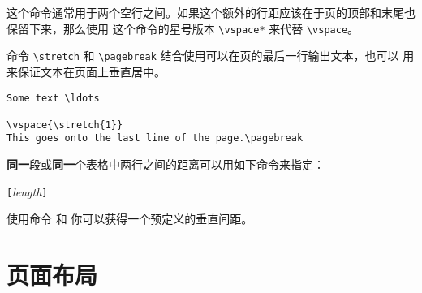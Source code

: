 这个命令通常用于两个空行之间。如果这个额外的行距应该在于页的顶部和末尾也保留下来，那么使用
这个命令的星号版本 \verb|\vspace*| 来代替 \verb|\vspace|。

命令 \verb|\stretch| 和 \verb|\pagebreak| 结合使用可以在页的最后一行输出文本，也可以
用来保证文本在页面上垂直居中。
\begin{code}
\begin{verbatim}
Some text \ldots

\vspace{\stretch{1}}
This goes onto the last line of the page.\pagebreak
\end{verbatim}
\end{code}

\textbf{同一}段或\textbf{同一}个表格中两行之间的距离可以用如下命令来指定：
\begin{lscommand}
\ci{\bs}\verb|[|\emph{length}\verb|]|
\end{lscommand}

使用命令  和  你可以获得一个预定义的垂直间距。

\section{页面布局}


